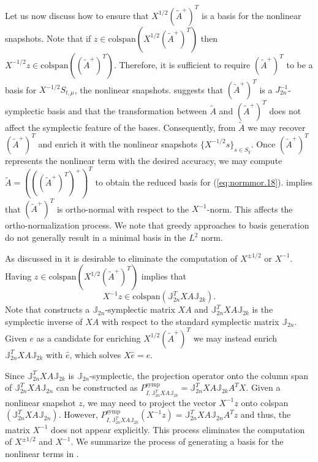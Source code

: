 Let us now discuss how to ensure that $X^{1/2} (\tilde A^+)^T$ is a basis for the nonlinear snapshots. Note that if $z \in \text{colspan}\left(X^{1/2} (\tilde A^+)^T\right)$ then $X^{-1/2} z \in \text{colspan}\left(( \tilde A^+)^T \right)$. Therefore, it is sufficient to require $(\tilde A^+)^T$ to be a basis for $X^{-1/2}S_{t,\mu}$, the nonlinear snapshots.  suggests that $(\tilde A^+)^T$ is a $J_{2n}^{-1}$-symplectic basis and that the transformation between $\tilde A$ and $(\tilde A^+)^T $ does not affect the symplectic feature of the bases. Consequently, from $\tilde A$ we may recover $(\tilde A^+)^T$ and enrich it with the nonlinear snapshots $\{ X^{-1/2} s \}_{s\in S_{g}}$. Once $(\tilde A^+)^T$ represents the nonlinear term with the desired accuracy, we may compute $\tilde A= \left( \left( ( \tilde A^+ )^T \right)^+ \right)^T$ to obtain the reduced basis for (\ref{eq:normmor.18}).  implies that $(\tilde A^+)^T$ is ortho-normal with respect to the $X^{-1}$-norm. This affects the ortho-normalization process. We note that greedy approaches to basis generation do not generally result in a minimal basis in the $L^{2}$ norm.

As discussed in  it is desirable to eliminate the computation of $X^{\pm 1/2}$ or $X^{-1}$. Having $z \in \text{colspan}\left(X^{1/2} (\tilde A^+)^T\right)$ implies that 
\begin{equation}
	X^{-1} z \in \text{colspan}(\mathbb J_{2n}^T X A \mathbb J_{2k}).
\end{equation}
Note that  constructs a $\mathbb J_{2n}$-symplectic matrix $XA$ and $\mathbb J_{2n}^T X A \mathbb J_{2k}$ is the symplectic inverse of $XA$ with respect to the standard symplectic matrix $\mathbb J_{2n}$. Given $e$ as a candidate for enriching $X^{1/2} (\tilde A^+)^T$ we may instead enrich $\mathbb J_{2n}^T X A \mathbb J_{2k}$ with $\hat e$, which solves $X \hat e = e$.

Since  $\mathbb J_{2n}^T X A \mathbb J_{2k}$ is $\mathbb J_{2n}$-symplectic, the projection operator onto the column span of $\mathbb J_{2n}^T X A \mathbb J_{2n}$ can be constructed as $P^{\text{symp}}_{I,\mathbb J_{2n}^T X A \mathbb J_{2k}}=\mathbb J_{2n}^T X A \mathbb J_{2k}A^TX$. Given a nonlinear snapshot $z$, we may need to project the vector $X^{-1}z$ onto colspan$(\mathbb J_{2n}^T X A \mathbb J_{2n})$. However, $P^{\text{symp}}_{I,\mathbb J_{2n}^T X A \mathbb J_{2k}}(X^{-1}z)=\mathbb J_{2n}^T X A \mathbb J_{2n}A^Tz$ and thus, the matrix $X^{-1}$ does not appear explicitly. This process eliminates the computation of $X^{\pm 1/2}$ and $X^{-1}$. We summarize the process of generating a basis for the nonlinear terms in .

